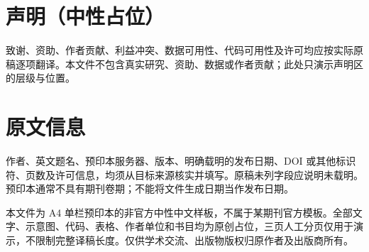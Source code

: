 \documentclass[UTF8,fontset=none,scheme=plain]{ctexart}
\begin{document}
\section*{声明（中性占位）}
致谢、资助、作者贡献、利益冲突、数据可用性、代码可用性及许可均应按实际原稿逐项翻译。本文件不包含真实研究、资助、数据或作者贡献；此处只演示声明区的层级与位置。

\section*{原文信息}
作者、英文题名、预印本服务器、版本、明确载明的发布日期、DOI 或其他标识符、页数及许可信息，均须从目标来源核实并填写。原稿未列字段应说明未载明。预印本通常不具有期刊卷期；不能将文件生成日期当作发布日期。

本文件为 A4 单栏预印本的非官方中性中文样板，不属于某期刊官方模板。全部文字、示意图、代码、表格、作者单位和书目均为原创占位，三页人工分页仅用于演示，不限制完整译稿长度。仅供学术交流、出版物版权归原作者及出版商所有。
\end{document}
